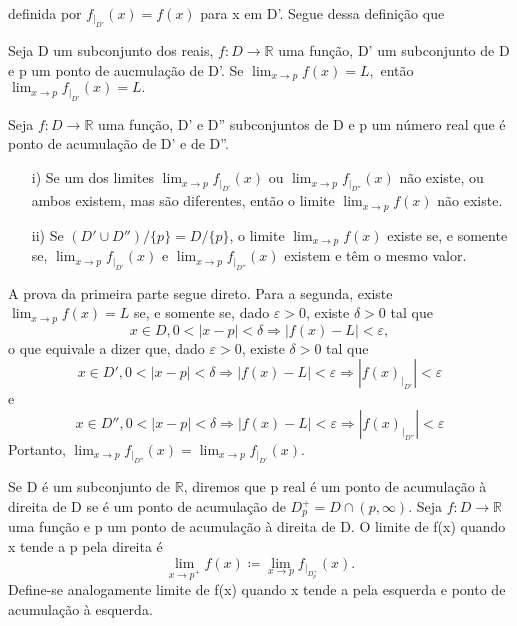 \documentclass[analysis_notes.tex]{subfiles}
\begin{document}
definida por $f_{|_{D'}}(x) = f(x)$ para x em D'. Segue dessa defini\c c\~ao que
\begin{theorem*}
	Seja D um subconjunto dos reais, $f:D\rightarrow \mathbb{R}$ uma fun\c c\~ao, D' um subconjunto de D e p um ponto de aucmula\c c\~ao de D'.
	Se $\lim_{x\to p}f(x) = L,$ ent\~ao $\lim_{x\to p}f_{|_{D'}}(x) = L.$
\end{theorem*}
\begin{theorem*}
	Seja $f:D\rightarrow \mathbb{R}$ uma fun\c c\~ao, D' e D'' subconjuntos de D e p um n\'umero real que \'e ponto de acumula\c c\~ao
	de D' e de D''.
	\begin{itemize}
		\item[i)] Se um dos limites $\lim_{x\to p}f_{|_{D'}}(x)$ ou $\lim_{x\to p}f_{|_{D''}}(x)$ n\~ao existe, ou ambos existem,
		      mas s\~ao diferentes, ent\~ao o limite $\lim_{x\to p}f(x)$ n\~ao existe.
		\item[ii)] Se $(D'\cup D'')/\{p\} = D/\{p\}$, o limite $\lim_{x\to p}f(x)$ existe se, e somente se, $\lim_{x\to p}f_{|_{D'}}(x)$ e
		      $\lim_{x\to p}f_{|_{D''}}(x)$ existem e t\^em o mesmo valor.
	\end{itemize}
\end{theorem*}
\begin{proof*}
	A prova da primeira parte segue direto. Para a segunda, existe $\lim_{x\to p }f(x) = L$ se, e somente se, dado $\varepsilon > 0$,
	existe $\delta > 0$ tal que
	$$
		x\in D, 0 < |x-p| < \delta \Rightarrow |f(x)-L| < \varepsilon,
	$$
	o que equivale a dizer que, dado $\varepsilon > 0$, existe $\delta > 0$ tal que
	$$
		x\in D', 0 < |x-p| < \delta \Rightarrow |f(x) - L|< \varepsilon \Rightarrow |f(x)_{|_{D'}}|<\varepsilon
	$$
	e
	$$
		x\in D'', 0 < |x-p| < \delta \Rightarrow |f(x) - L|< \varepsilon \Rightarrow |f(x)_{|_{D''}}|<\varepsilon
	$$
	Portanto, $\lim_{x\to p}f_{|_{D''}}(x) = \lim_{x\to p}f_{|_{D'}}(x)$. \qedsymbol
\end{proof*}
\begin{def*}
	Se D \'e um subconjunto de $\mathbb{R}$, diremos que p real \'e um ponto de acumula\c c\~ao \`a direita de D se \'e um ponto
	de acumula\c c\~ao de $D_{p}^{+} = D\cap{(p, \infty)}$. Seja $f:D\rightarrow \mathbb{R}$ uma fun\c c\~ao e p um ponto de
	acumula\c c\~ao \`a direita de D. O limite de f(x) quando x tende a p pela direita \'e
	$$
		\lim_{x\to p^{+}}f(x)\coloneqq \lim_{x\to p}f_{|_{D_{p}^{+}}}(x).
	$$
	Define-se analogamente limite de f(x) quando x tende a pela esquerda e ponto de acumula\c c\~ao \`a esquerda.
\end{def*}
\end{document}
